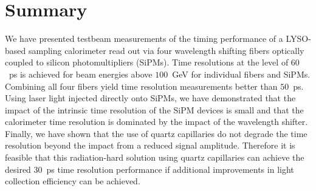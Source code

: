 \section{Summary}

We have presented testbeam measurements of the timing performance of a LYSO-based sampling calorimeter
read out via four wavelength shifting fibers optically coupled to silicon photomultipliers (SiPMs).
Time resolutions at the level of $60$~ps is achieved for beam energies above $100$~GeV for individual fibers
and SiPMs. Combining all four fibers yield time resolution measurements better than $50$~ps. Using laser
light injected directly onto SiPMs, we have demonstrated that the impact of the intrinsic time resolution
of the SiPM devices is small and that the calorimeter time resolution is dominated by the impact of the
wavelength shifter. Finally, we have shown that the use of quartz capillaries do not degrade the time resolution
beyond the impact from a reduced signal amplitude. Therefore it is feasible that this
radiation-hard solution using quartz capillaries can achieve the desired $30$~ps time resolution performance if 
additional improvements in light collection efficiency can be achieved.
